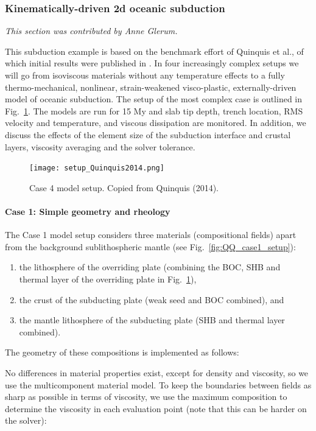 \subsubsection{Kinematically-driven 2d oceanic subduction}
\label{sec:cookbooks-kinematic-2d-oceanic-subduction}

\textit{This section was contributed by Anne Glerum.}

This subduction example is based on the benchmark effort of Quinquis et al., of which initial results were published in \cite{Quinquis2014}. In four increasingly complex setups we will go from isoviscous materials without any temperature effects to a fully thermo-mechanical, nonlinear, strain-weakened visco-plastic, externally-driven model of oceanic subduction. The setup of the most complex case is outlined in Fig.~\ref{fig:QQ_setup}. The models are run for 15 My and slab tip depth, trench location, RMS velocity and temperature, and viscous dissipation are monitored. In addition, we discuss the effects of the element size of the subduction interface and crustal layers, viscosity averaging and the solver tolerance.

\begin{figure}
    \centering
    \texttt{[image: setup\_Quinquis2014.png]}
    \caption{Case 4 model setup. Copied from Quinquis (2014).}
    \label{fig:QQ_setup}
\end{figure}

\paragraph{Case 1: Simple geometry and rheology}
The Case 1 model setup considers three materials (compositional fields) apart from the background sublithospheric mantle (see Fig.~\ref{fig:QQ_case1_setup}): 
\begin{enumerate}
    \item the lithosphere of the overriding plate (combining the BOC, SHB and thermal layer of the overriding plate in Fig.~\ref{fig:QQ_setup}),
    \item the crust of the subducting plate (weak seed and BOC combined), and
    \item the mantle lithosphere of the subducting plate (SHB and thermal layer combined).
\end{enumerate}{}
The geometry of these compositions is implemented as follows:


No differences in material properties exist, except for density and viscosity, so we use the multicomponent material model. To keep the boundaries between fields as sharp as possible in terms of viscosity, we use the maximum composition to determine the viscosity in each evaluation point (note that this can be harder on the solver):


